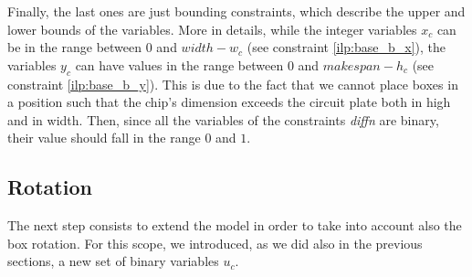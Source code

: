     Finally, the last ones are just bounding constraints, which describe the upper and lower bounds
    of the variables. More in details, while the integer variables \(x_c\) can be in the range 
    between \(0\) and \(width-w_c\) (see constraint \ref{ilp:base_b_x}), the variables \(y_c\) 
    can have values in the range between \(0\) and \(makespan-h_c\) (see constraint 
    \ref{ilp:base_b_y}). This is due to the fact that we cannot place boxes in a position such that 
    the chip's dimension exceeds the circuit plate both in high and in width. Then, since all the 
    variables of the constraints \textit{diffn} are binary, their value should fall in the range 
    \(0\) and \(1\).

\subsection{Rotation}
    The next step consists to extend the model in order to take into account also the box rotation.
    For this scope, we introduced, as we did also in the previous sections, a new set of binary 
    variables \(u_c\). 

